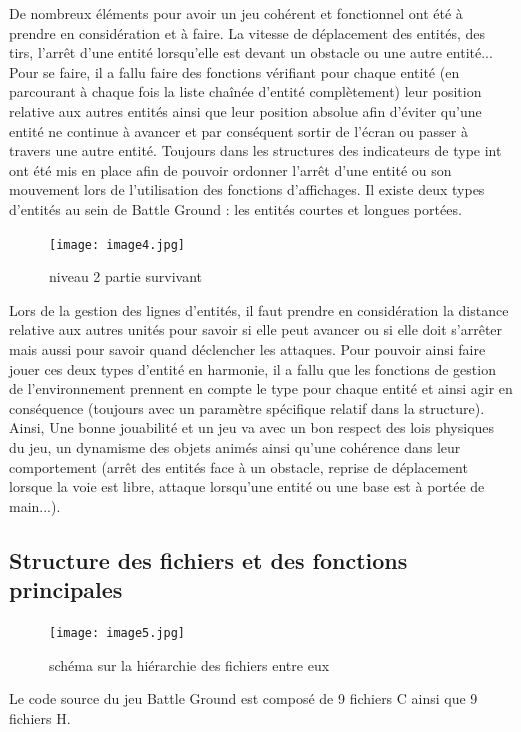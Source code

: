 \documentclass[a4paper,11pt]{article}
\begin{document}
De nombreux éléments pour avoir un jeu cohérent et fonctionnel ont été à prendre en considération et à faire. La vitesse de déplacement des entités,
des tirs, l'arrêt d'une entité lorsqu'elle est devant un obstacle ou une autre entité... Pour se faire, il a fallu faire des fonctions vérifiant pour chaque
entité (en parcourant à chaque fois la liste chaînée d'entité complètement) leur position relative aux autres entités ainsi que leur position absolue afin
d'éviter qu'une entité ne continue à avancer et par conséquent sortir de l'écran ou passer à travers une autre entité. Toujours dans les structures des indicateurs
de type int ont été mis en place afin de pouvoir ordonner l'arrêt d'une entité ou son mouvement lors de l'utilisation des fonctions d'affichages.
Il existe deux types d'entités au sein de Battle Ground : les entités courtes et longues portées.
\begin{figure}[ht!]
\centering
\texttt{[image: image4.jpg]} 
\caption {\label{image7} niveau 2 partie survivant}
\end{figure}
 \smallbreak
Lors de la gestion des lignes d'entités, il faut prendre en considération la distance relative aux autres unités pour savoir si elle peut avancer ou si elle doit
s'arrêter mais aussi pour savoir quand déclencher les attaques. Pour pouvoir ainsi faire jouer ces deux types d'entité en harmonie, il a fallu
que les fonctions de gestion de l'environnement prennent en compte le type pour chaque entité et ainsi agir en conséquence (toujours avec un paramètre spécifique relatif dans la structure).
Ainsi, Une bonne jouabilité et un jeu  va avec un bon respect des lois physiques du jeu, un dynamisme des objets animés ainsi qu'une cohérence dans leur comportement (arrêt des entités face à un obstacle,
reprise de déplacement lorsque la voie est libre, attaque lorsqu'une entité ou une base est à portée de main...).

\subsection{Structure des fichiers et des fonctions principales}
\begin{figure}[ht!]
\centering
\texttt{[image: image5.jpg]} 
\caption {\label{image8} schéma sur la hiérarchie des fichiers entre eux}
\end{figure}
 \smallbreak
Le code source du jeu Battle Ground est composé de 9 fichiers C ainsi que 9 fichiers H.
\end{document}
